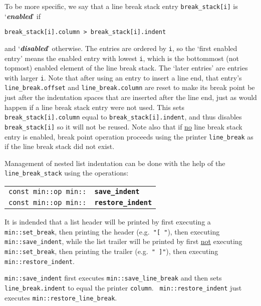 \documentclass[12pt]{article}
\makeatletter
\newcommand{\key}[1]{{\bf \em #1}\index{#1}}
\newcommand{\ttindex}[1]{\index{#1@{\tt #1}}}
\newcommand{\minindex}[1]{\ttindex{min::#1}\ttindex{#1}}
\newcommand{\EOL}{\penalty \exhyphenpenalty}
\newenvironment{indpar}[1][0.3in]%
	{\begin{list}{}%
		     {\setlength{\itemsep}{0in}%
		      \setlength{\topsep}{0in}%
		      \setlength{\parsep}{1ex}%
		      \setlength{\labelwidth}{#1}%
		      \setlength{\leftmargin}{#1}%
		      \addtolength{\leftmargin}{\labelsep}}%
	 \item}%
	{\end{list}}
\newcommand{\LABEL}[1]{\label{#1}}
\newcommand{\MINKEY}[1]{{\tt \bf #1}\minindex{#1}}
\makeatother
\begin{document}
To be more specific, we say that a line break stack
entry {\tt break\_\EOL stack[i]} is `\key{enabled}' if
\begin{center}
\tt break\_stack[i].column > break\_stack[i].indent
\end{center}
and `\key{disabled}' otherwise.  The entries are ordered by {\tt i},
so the `first enabled entry' means the enabled entry with lowest {\tt i},
which is the bottommost (not topmost) enabled element of the line break stack.
The `later entries' are entries with larger {\tt i}.  Note that
after using an entry to insert a line end, that entry's
{\tt line\_\EOL break.offset}
and {\tt line\_\EOL break.column} are reset to make its break point
be just after the indentation spaces that are inserted after the line end,
just as would happen if a line break stack entry were not used.  This sets
{\tt break\_\EOL stack[i].column} equal to {\tt break\_\EOL stack[i].indent},
and thus disables {\tt break\_\EOL stack[i]} so it will not be reused.
Note also that if \underline{no} line break stack entry is enabled,
break point operation proceeds using the printer {\tt line\_\EOL break}
as if the line break stack did not exist.

Management of nested list indentation can be done with the help of
the {\tt line\_\EOL break\_\EOL stack} using the operations:

\begin{indpar}[1em]\begin{tabular}{r@{}l}
\verb|const min::op min::|
    & \MINKEY{save\_indent}
\LABEL{MIN::SAVE_INDENT} \\
\verb|const min::op min::|
    & \MINKEY{restore\_indent}
\LABEL{MIN::RESTORE_INDENT} \\
\end{tabular}\end{indpar}

It is indended that a list header will be printed by first
executing a {\tt min::\EOL set\_\EOL break}, then printing the
header (e.g.~{\tt "[ "}), then executing
{\tt min::save\_indent}, while the list trailer will be printed
by first \underline{not} executing {\tt min::\EOL set\_\EOL break},
then printing the trailer (e.g.~{\tt " ]"}), then executing
{\tt min::\EOL restore\_\EOL indent}.

{\tt min::save\_indent} first executes
{\tt min::\EOL save\_\EOL line\_\EOL break} and then
sets {\tt line\_\EOL break.indent} to equal the printer
{\tt column}.
~{\tt min::restore\_\EOL indent} just
executes {\tt min::\EOL restore\_\EOL line\_\EOL break}.
\end{document}
